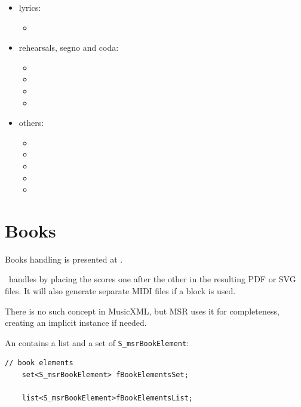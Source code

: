 \begin{itemize}
\item lyrics:

\begin{itemize}
	\item {}
  \end{itemize}

\item rehearsals, segno and coda:

\begin{itemize}
  \item {}
	\item {}
  \item {}
  \item {}
 \end{itemize}

\item others:

\begin{itemize}
  \item {}
  \item {}
  \item {}
  \item {}
  \item {}
  \end{itemize}

\end{itemize}


\section{Books}\label{Books}

Books handling is presented at .

\lily\ handles  by placing the scores one after the other in the resulting PDF or SVG files. It will also generate separate MIDI files if a  block is used.

There is no such concept in MusicXML, but MSR uses it for completeness, creating an implicit  instance if needed.

An  contains a list and a set of {\tt S_msrBookElement}:
\begin{lstlisting}[language=CPlusPlus]
    // book elements
    set<S_msrBookElement> fBookElementsSet;

    list<S_msrBookElement>fBookElementsList;
\end{lstlisting}

